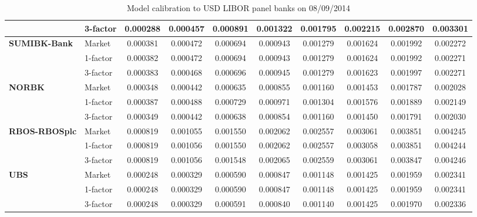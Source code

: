 \documentclass[12pt,a4paper]{article}
\theoremstyle{plain}
\numberwithin{equation}{section}
\begin{document}
{\begin{table}[t]
{\begin{tabular}{|rl|cccccccc|}
          & 3-factor & 0.000288 & 0.000457 & 0.000891 & 0.001322 & 0.001795 & 0.002215 & 0.002870 & 0.003301 \\
    \hline
    \hline
    \multicolumn{1}{|l}{\textbf{SUMIBK-Bank}} & Market & 0.000381 & 0.000472 & 0.000694 & 0.000943 & 0.001279 & 0.001624 & 0.001992 & 0.002272 \\
\cmidrule{3-10}          & 1-factor & 0.000382 & 0.000472 & 0.000694 & 0.000943 & 0.001279 & 0.001624 & 0.001992 & 0.002271 \\
          & 3-factor & 0.000383 & 0.000468 & 0.000696 & 0.000945 & 0.001279 & 0.001623 & 0.001997 & 0.002271 \\
    \hline
    \hline
    \multicolumn{1}{|l}{\textbf{NORBK}} & Market & 0.000348 & 0.000442 & 0.000635 & 0.000855 & 0.001160 & 0.001453 & 0.001787 & 0.002028 \\
\cmidrule{3-10}          & 1-factor & 0.000387 & 0.000488 & 0.000729 & 0.000971 & 0.001304 & 0.001576 & 0.001889 & 0.002149 \\
          & 3-factor & 0.000349 & 0.000442 & 0.000638 & 0.000854 & 0.001160 & 0.001450 & 0.001791 & 0.002030 \\
   \hline
    \hline
    \multicolumn{1}{|l}{\textbf{RBOS-RBOSplc}} & Market & 0.000819 & 0.001055 & 0.001550 & 0.002062 & 0.002557 & 0.003061 & 0.003851 & 0.004245 \\
\cmidrule{3-10}          & 1-factor & 0.000819 & 0.001056 & 0.001550 & 0.002062 & 0.002557 & 0.003058 & 0.003851 & 0.004244 \\
          & 3-factor & 0.000819 & 0.001056 & 0.001548 & 0.002065 & 0.002559 & 0.003061 & 0.003847 & 0.004246 \\
   \hline
    \hline
    \multicolumn{1}{|l}{\textbf{UBS}} & Market & 0.000248 & 0.000329 & 0.000590 & 0.000847 & 0.001148 & 0.001425 & 0.001959 & 0.002341 \\
\cmidrule{3-10}          & 1-factor & 0.000248 & 0.000329 & 0.000590 & 0.000847 & 0.001148 & 0.001425 & 0.001959 & 0.002341 \\
          & 3-factor & 0.000248 & 0.000329 & 0.000591 & 0.000840 & 0.001140 & 0.001425 & 0.001970 & 0.002336 \\

    \hline
    \end{tabular}%
    }
    \caption{Model calibration to USD LIBOR panel banks on 08/09/2014 }
  \label{CDSfit140908}%
\end{table}%

}
\end{document}
